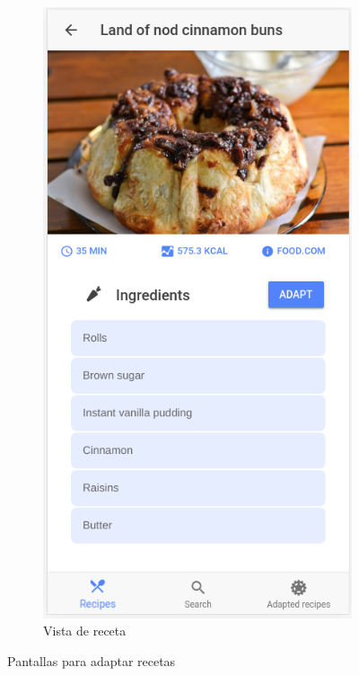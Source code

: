 \begin{figure}[H]
\begin{subfigure}[b]{0.319\linewidth}
        \label{fig:app_6}
    \end{subfigure}
        \begin{subfigure}[b]{0.32\linewidth}
        \includegraphics[width=\linewidth]{imagenes/app/pantallas/ejemplo1.png}
        \caption{Vista de receta}
        \label{fig:ejemplo1_}
    \end{subfigure}
    \caption{Pantallas para adaptar recetas}
    \label{fig:pantallas_inicio3}
\end{figure}

